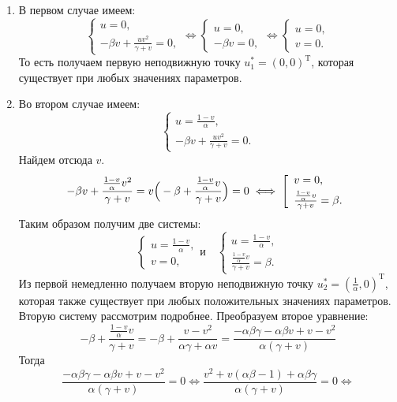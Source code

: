 \documentclass[10pt]{article}
\numberwithin{equation}{section}
\begin{document}
\begin{enumerate}
	\item В первом случае имеем:
	\[ \begin{cases} u = 0 , \\ -\beta v + \frac{uv^2}{\gamma + v} = 0, \end{cases}  \iff \begin{cases} u =  0 , \\ -\beta v = 0, \end{cases} \iff \begin{cases} u = 0, \\ v = 0. \end{cases} \]
	То есть получаем первую неподвижную точку \( u_1^* = (0, 0)^{\mathrm{T}} \), которая существует при любых значениях параметров.
	\item Во втором случае имеем:
	\[\begin{cases} u = \frac{1 - v}{\alpha}, \\ -\beta v + \frac{uv^2}{\gamma + v} = 0. \end{cases}  \]
	Найдем отсюда \( v \). 
	\[ -\beta v + \frac{\frac{1 - v}{\alpha}v^2}{\gamma + v} = v\Big(-\beta + \frac{\frac{1 - v}{\alpha} v}{\gamma + v}\Big) = 0 \iff \left[ \begin{array}{l} v = 0, \smallskip\\ \frac{\frac{1 - v}{\alpha} v}{\gamma + v} = \beta. \\ \end{array} \right.\]
	Таким образом получим две системы:
	\[ \begin{cases} u = \frac{1 - v}{\alpha} , \\ v = 0, \end{cases} \text{и}  \quad \begin{cases} u = \frac{1 - v}{\alpha}, \\ \frac{\frac{1 - v}{\alpha} v}{\gamma + v} = \beta. \end{cases} \]
	Из первой немедленно получаем вторую неподвижную точку \( u_2^* = (\frac{1}{\alpha}, 0)^{\mathrm{T}} \), которая также существует при любых положительных значениях параметров. Вторую систему рассмотрим подробнее. Преобразуем второе уравнение:
	\[ -\beta + \frac{\frac{1 - v}{\alpha} v}{\gamma + v} = -\beta + \frac{v - v^2}{\alpha \gamma + \alpha v} = \frac{-\alpha \beta \gamma - \alpha \beta v + v - v^2}{\alpha (\gamma + v)} \]
	Тогда 
	\[ \frac{-\alpha \beta \gamma - \alpha \beta v + v - v^2}{\alpha (\gamma + v)} = 0 \iff \frac{v^2 + v(\alpha \beta - 1) + \alpha \beta \gamma}{\alpha (\gamma + v)} = 0 \iff \]

\end{enumerate}
\end{document}
